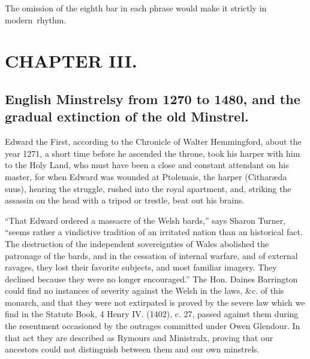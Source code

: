 \renewcommand\versoheader{english minstrelsy resumed.}
\renewcommand\rectoheader{edward i.}
\DFNsingle

The omission of the eighth bar in each phrase would make it strictly in modern~rhythm.


\section*{CHAPTER III.}

\subsection{English Minstrelsy from 1270 to 1480, and the gradual extinction
of the old Minstrel.}

Edward the First, according to the Chronicle of Walter Hemmingford, about the
year 1271, a short time before he ascended the throne, took his harper with him
to the Holy Land, who must have been a close and constant attendant on his
master, for when Edward was wounded at Ptolemais, the harper (Citharæda
suus), hearing the struggle, rushed into the royal apartment, and, striking the
assassin on the head with a tripod or trestle, beat out his brains.

“That Edward ordered a massacre of the Welsh bards,” says Sharon Turner,
“seems rather a vindictive tradition of an irritated nation than an historical fact.
The destruction of the independent sovereignties of Wales abolished the patronage
of the bards, and in the cessation of internal warfare, and of external ravages,
they lost their favorite subjects, and most familiar imagery. They declined
because they were no longer encouraged.” The Hon. Daines Barrington could
find no instances of severity against the Welsh in the laws, \&c. of this monarch, %
and that they were not extirpated is proved by the severe law which we find in
the Statute Book, 4 Henry IV. (1402), c. 27, passed against them during the
resentment occasioned by the outrages committed under Owen Glendour. In that
act they are described as Rymours and Ministralx, proving that our ancestors
could not distinguish between them and our own minstrels.

\DFNdouble

